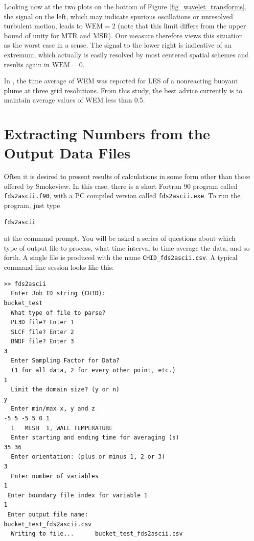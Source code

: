\documentclass[11pt]{book}
\newcommand{\ct}{\tt\small}
\begin{document}
Looking now at the two plots on the bottom of Figure \ref{fig_wavelet_transforms}, the signal on the left, which may indicate spurious oscillations or unresolved turbulent motion, leads to $\mbox{WEM} = 2$ (note that this limit differs from the upper bound of unity for MTR and MSR).  Our measure therefore views this situation as the worst case in a sense.  The signal to the lower right is indicative of an extremum, which actually is easily resolved by most centered spatial schemes and results again in $\mbox{WEM}=0$.

In \cite{McDermott:2010}, the time average of WEM was reported for LES of a nonreacting buoyant plume at three grid resolutions.  From this study, the best advice currently is to maintain average values of WEM less than 0.5.



\clearpage


\section{Extracting Numbers from the Output Data Files}
\label{info:fds2ascii}

Often it is desired to present results of calculations in some form other
than those offered by Smokeview. In this case, there is a short
Fortran 90 program called {\ct fds2ascii.f90}, with a PC compiled version
called {\ct fds2ascii.exe}. To run the program, just type
\begin{verbatim}
fds2ascii
\end{verbatim}
at the command prompt. You will be asked a series of questions
about which type of output file to process, what time interval to
time average the data, and so forth. A single file is produced
with the name {\ct CHID\_fds2ascii.csv}. A typical command line session looks like this:

\footnotesize
\begin{verbatim}
>> fds2ascii
  Enter Job ID string (CHID):
bucket_test
  What type of file to parse?
  PL3D file? Enter 1
  SLCF file? Enter 2
  BNDF file? Enter 3
3
  Enter Sampling Factor for Data?
  (1 for all data, 2 for every other point, etc.)
1
  Limit the domain size? (y or n)
y
  Enter min/max x, y and z
-5 5 -5 5 0 1
  1   MESH  1, WALL TEMPERATURE
  Enter starting and ending time for averaging (s)
35 36
  Enter orientation: (plus or minus 1, 2 or 3)
3
  Enter number of variables
1
 Enter boundary file index for variable 1
1
 Enter output file name:
bucket_test_fds2ascii.csv
  Writing to file...      bucket_test_fds2ascii.csv
\end{verbatim}
\end{document}
